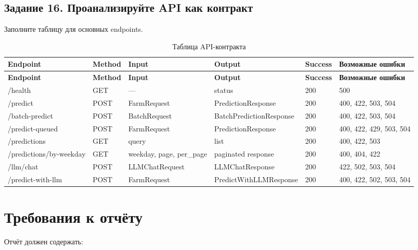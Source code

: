 \documentclass[12pt,a4paper]{article}
\begin{document}
\subsection{Задание 16. Проанализируйте API как контракт}

Заполните таблицу для основных endpoints.

\begin{longtable}{|p{3.2cm}|p{1.4cm}|p{2.4cm}|p{3cm}|p{1.2cm}|p{2.4cm}|}
\caption{Таблица API-контракта}
\label{tab:api_contract}\\
\hline
\textbf{Endpoint} & \textbf{Method} & \textbf{Input} & \textbf{Output} & \textbf{Success} & \textbf{Возможные ошибки} \\
\hline
\endfirsthead
\hline
\textbf{Endpoint} & \textbf{Method} & \textbf{Input} & \textbf{Output} & \textbf{Success} & \textbf{Возможные ошибки} \\
\hline
\endhead
/health & GET & --- & status & 200 & 500 \\
/predict & POST & FarmRequest & PredictionResponse & 200 & 400, 422, 503, 504 \\
/batch-predict & POST & BatchRequest & BatchPredictionResponse & 200 & 400, 422, 503, 504 \\
/predict-queued & POST & FarmRequest & PredictionResponse & 200 & 400, 422, 429, 503, 504 \\
/predictions & GET & query & list & 200 & 400, 422, 503 \\
/predictions/by-weekday & GET & weekday, page, per\_page & paginated response & 200 & 400, 404, 422 \\
/llm/chat & POST & LLMChatRequest & LLMChatResponse & 200 & 422, 502, 503, 504 \\
/predict-with-llm & POST & FarmRequest & PredictWithLLMResponse & 200 & 400, 422, 502, 503, 504 \\
\hline
\end{longtable}

\section{Требования к отчёту}

Отчёт должен содержать:
\end{document}

